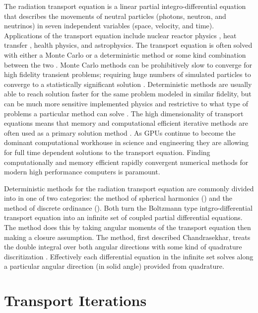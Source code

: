 The radiation transport equation is a linear partial integro-differential equation that describes the movements of neutral particles (photons, neutron, and neutrinos) in seven independent variables (space, velocity, and time).
Applications of the transport equation include nuclear reactor physics \cite{duderstadt_hamilton}, heat transfer \cite{radheattrans2003}, health physics, and astrophysics.
The transport equation is often solved with either a Monte Carlo or a deterministic method or some kind combination between the two \cite{lewis_computational_1984}.
Monte Carlo methods can be prohibitively slow to converge for high fidelity transient problems; requiring huge numbers of simulated particles to converge to a statistically significant solution \cite{lux_1998}.
Deterministic methods are usually able to reach solution faster for the same problem modeled in similar fidelity, but can be much more sensitive implemented physics and restrictive to what type of problems a particular method can solve \cite{lewis_computational_1984}. 
The high dimensionality of transport equations means that memory and computational efficient iterative methods are often used as a primary solution method \cite{adams_fast_2002}.
As GPUs continue to become the dominant computational workhouse in science and engineering they are allowing for full time dependent solutions to the transport equation.
Finding computationally and memory efficient rapidly convergent numerical methods for modern high performance computers is paramount.

Deterministic methods for the radiation transport equation are commonly divided into in one of two categories: the method of spherical harmonics (\pn) and the method of discrete ordinance (\sn).
Both turn the Boltzmann type intgro-differential transport equation into an infinite set of coupled partial differential equations.
The \pn method does this by taking angular moments of the transport equation then making a closure assumption.
The \sn method, first described Chandrasekhar, treats the double integral over both angular directions with some kind of quadrature discritization \cite{chandrasekhar1960radiative}.
Effectively each differential equation in the infinite set solves along a particular angular direction (in solid angle) provided from quadrature.

\section{Transport Iterations}

